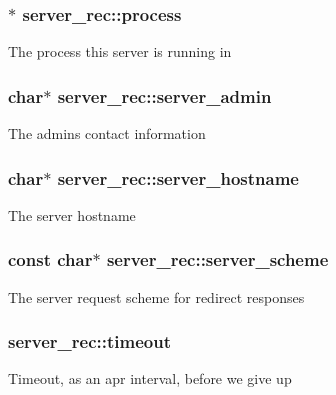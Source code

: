 \subsubsection[{\texorpdfstring{process}{process}}]{$\ast$ server\+\_\+rec\+::process}\hypertarget{structserver__rec_a3b662494b2e2b691143ffb85b1c1d658}{}\label{structserver__rec_a3b662494b2e2b691143ffb85b1c1d658}
The process this server is running in 
\subsubsection[{\texorpdfstring{server\+\_\+admin}{server_admin}}]{\setlength{\rightskip}{0pt plus 5cm}char$\ast$ server\+\_\+rec\+::server\+\_\+admin}\hypertarget{structserver__rec_aea2c11ad4b93b031976add937d1f6d9b}{}\label{structserver__rec_aea2c11ad4b93b031976add937d1f6d9b}
The admin\textquotesingle{}s contact information 
\subsubsection[{\texorpdfstring{server\+\_\+hostname}{server_hostname}}]{\setlength{\rightskip}{0pt plus 5cm}char$\ast$ server\+\_\+rec\+::server\+\_\+hostname}\hypertarget{structserver__rec_aa4841163cff5e708d1e125ccbbd5fe35}{}\label{structserver__rec_aa4841163cff5e708d1e125ccbbd5fe35}
The server hostname 
\subsubsection[{\texorpdfstring{server\+\_\+scheme}{server_scheme}}]{\setlength{\rightskip}{0pt plus 5cm}const char$\ast$ server\+\_\+rec\+::server\+\_\+scheme}\hypertarget{structserver__rec_a78b9b80c3bc86d20ac86b7d3774da86c}{}\label{structserver__rec_a78b9b80c3bc86d20ac86b7d3774da86c}
The server request scheme for redirect responses 
\subsubsection[{\texorpdfstring{timeout}{timeout}}]{ server\+\_\+rec\+::timeout}\hypertarget{structserver__rec_a34ba2512b6d2d1bdb08ca9bff3615b80}{}\label{structserver__rec_a34ba2512b6d2d1bdb08ca9bff3615b80}
Timeout, as an apr interval, before we give up 
